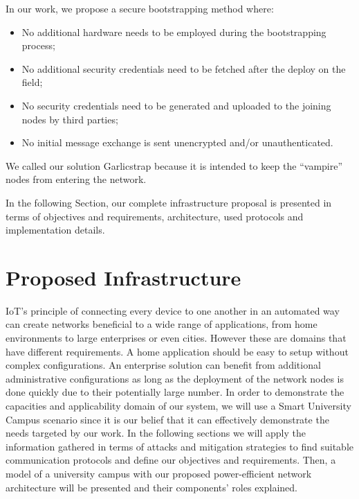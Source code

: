 \documentclass{llncs}
\begin{document}
In our work, we propose a secure bootstrapping method where:
\begin{itemize}
	\item No additional hardware needs to be employed during the bootstrapping process;
	\item No additional security credentials need to be fetched after the deploy on the field;
	\item No security credentials need to be generated and uploaded to the joining nodes by third parties;
	\item No initial message exchange is sent unencrypted and/or unauthenticated.
\end{itemize}

We called our solution Garlicstrap because it is intended to keep the ``vampire'' nodes from entering the network\footnotemark. 

In the following Section, our complete infrastructure proposal is presented in terms of objectives and requirements, architecture, used protocols and implementation details. 

\section{Proposed Infrastructure}
\label{sec:proposed_infrastructure}
\ac{IoT}'s principle of connecting every device to one another in an automated way can create networks beneficial to a wide range of applications, from home environments to large enterprises or even cities. 
However these are domains that have different requirements. 
A home application should be easy to setup without complex configurations. 
An enterprise solution can benefit from additional administrative configurations as long as the deployment of the network nodes is done quickly due to their potentially large number. 
In order to demonstrate the capacities and applicability domain of our system, we will use a Smart University Campus scenario since it is our belief that it can effectively demonstrate the needs targeted by our work.
In the following sections we will apply the information gathered in terms of attacks and mitigation strategies to find suitable communication protocols and define our objectives and requirements. 
Then, a model of a university campus with our proposed power-efficient network architecture will be presented and their components' roles explained.
\end{document}
